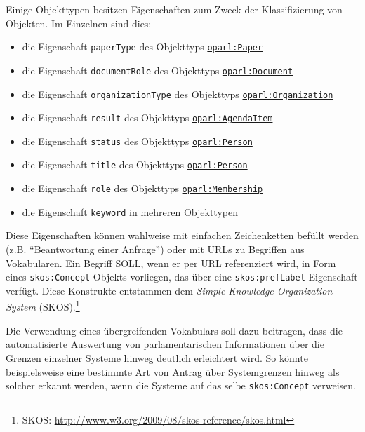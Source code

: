 \documentclass[,a4paper]{article}
\begin{document}

Einige Objekttypen besitzen Eigenschaften zum Zweck der Klassifizierung
von Objekten. Im Einzelnen sind dies:

\begin{itemize}
\itemsep1pt\parskip0pt
\item
  die Eigenschaft \texttt{paperType} des Objekttyps
  \hyperref[oparlux5fpaper]{\texttt{oparl:Paper}}
\item
  die Eigenschaft \texttt{documentRole} des Objekttyps
  \hyperref[oparlux5fdocument]{\texttt{oparl:Document}}
\item
  die Eigenschaft \texttt{organizationType} des Objekttyps
  \hyperref[oparlux5forganization]{\texttt{oparl:Organization}}
\item
  die Eigenschaft \texttt{result} des Objekttyps
  \hyperref[oparlux5fagendaitem]{\texttt{oparl:AgendaItem}}
\item
  die Eigenschaft \texttt{status} des Objekttyps
  \hyperref[oparlux5fperson]{\texttt{oparl:Person}}
\item
  die Eigenschaft \texttt{title} des Objekttyps
  \hyperref[oparlux5fperson]{\texttt{oparl:Person}}
\item
  die Eigenschaft \texttt{role} des Objekttyps
  \hyperref[oparlux5fmembership]{\texttt{oparl:Membership}}
\item
  die Eigenschaft \texttt{keyword} in mehreren Objekttypen
\end{itemize}

Diese Eigenschaften können wahlweise mit einfachen Zeichenketten befüllt
werden (z.B. ``Beantwortung einer Anfrage'') oder mit URLs zu Begriffen
aus Vokabularen. Ein Begriff SOLL, wenn er per URL referenziert wird, in
Form eines \texttt{skos:Concept} Objekts vorliegen, das über eine
\texttt{skos:prefLabel} Eigenschaft verfügt. Diese Konstrukte entstammen
dem \emph{Simple Knowledge Organization System} (SKOS).\footnote{SKOS:
  \url{http://www.w3.org/2009/08/skos-reference/skos.html}}

Die Verwendung eines übergreifenden Vokabulars soll dazu beitragen, dass
die automatisierte Auswertung von parlamentarischen Informationen über
die Grenzen einzelner Systeme hinweg deutlich erleichtert wird. So
könnte beispielsweise eine bestimmte Art von Antrag über Systemgrenzen
hinweg als solcher erkannt werden, wenn die Systeme auf das selbe
\texttt{skos:Concept} verweisen.
\end{document}
